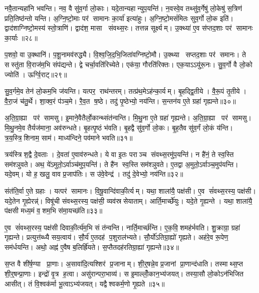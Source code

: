 नवै॒तान्यहा॑नि भवन्ति। नव॒ वै सु॑व॒र्गा लो॒काः। यदे॒तान्यहान्युप॒यन्ति॑। न॒वस्वे॒व तथ्सु॑व॒र्गेषु॑ लो॒केषु॑ स॒त्रिण॑ प्रति॒तिष्ठ॑न्तो यन्ति। अ॒ग्नि॒ष्टो॒माः पर॑ सामानः का॒र्या॑ इत्या॑हुः। अ॒ग्नि॒ष्टो॒मसं॑मितः सुव॒र्गो लो॒क इति॑। द्वाद॑शाग्निष्टो॒मस्य॑ स्तो॒त्राणि॑। द्वाद॑श॒ मासा संवथ्स॒रः। तत्तन्न सूर्क्ष्यम्। उ॒क्थ्या॑ ए॒व स॑प्तद॒शाः पर॑ सामानः का॒र्याः॥२८॥

प॒शवो॒ वा उ॒क्थानि॑। प॒शू॒नामव॑रुद्ध्यै। वि॒श्व॒जि॒द॒भि॒जिता॑वग्निष्टो॒मौ। उ॒क्थ्या सप्तद॒शाः पर॑ समानः। ते सस्तु॑ता वि॒राज॑म॒भि संप॑द्यन्ते। द्वे चर्चा॒वति॑रिच्येते। एक॑या॒ गौरति॑रिक्तः। एक॒याऽऽयु॑रू॒नः। सु॒व॒र्गो वै लो॒को ज्योति॑। ऊर्ग्वि॒राट्॥२९॥

सु॒व॒र्गमे॒व तेन॑ लो॒कम॒भि ज॑यन्ति। यत्पर॒ राथ॑न्तरम्। तत्प्र॑थ॒मेऽह॑न्का॒र्यम्। बृ॒हद्द्वि॒तीये। वै॒रू॒पं तृ॒तीये। वै॒रा॒जं च॑तु॒र्थे। शा॒क्व॒रं प॑ञ्च॒मे। रै॒व॒त ष॒ष्ठे। तदु॑ पृ॒ष्ठेभ्यो॒ नय॑न्ति। स॒न्तन॑य ए॒ते ग्रहा॑ गृह्यन्ते॥३०॥

अ॒ति॒ग्रा॒ह्या पर॑ सामसु। इ॒माने॒वैतैर्लो॒कान्थ्संत॑न्वन्ति। मि॒थु॒ना ए॒ते ग्रहा॑ गृह्यन्ते। अ॒ति॒ग्रा॒ह्या पर॑ सामसु। मि॒थु॒नमे॒व तैर्यज॑माना॒ अव॑रुन्धते। बृ॒हत्पृ॒ष्ठं भ॑वति। बृ॒हद्वै सु॑व॒र्गो लो॒कः। बृ॒ह॒तैव सु॑व॒र्गं लो॒कं य॑न्ति। त्र॒य॒स्त्रि॒शिनाम॒ साम॑। माध्य॑न्दिने॒ पव॑माने भवति॥३१॥

त्रय॑स्त्रिश॒द्वै दे॒वताः। दे॒वता॑ ए॒वाव॑रुन्धते। ये वा इ॒तः पराञ्च संवथ्स॒रमु॑प॒यन्ति॑। न है॑नं॒ ते स्व॒स्ति सम॑श्ञुवते। अथ॒ ये॑ऽमुतो॒ऽर्वाञ्च॑मुप॒यन्ति॑। ते है॑न स्व॒स्ति सम॑श्ञुवते। ए॒तद्वा अ॒मुतो॒ऽर्वाञ्च॒मुप॑यन्ति। यदे॒वम्। यो ह॒ खलु॒ वाव प्र॒जाप॑तिः। स उ॑वे॒वेन्द्र॑। तदु॑ दे॒वेभ्यो॒ नय॑न्ति॥३२॥\anuvakamend[का॒र्या॑ वि॒राड्गृ॑ह्यन्ते॒ पव॑माने भव॒तीन्द्र॒ एकं॑ च]

संत॑ति॒र्वा ए॒ते ग्रहाः। यत्पर॑ सामानः। वि॒षू॒वान्दि॑वाकी॒र्त्यम्। यथा॒ शाला॑यै॒ पक्ष॑सी। ए॒व सं॑वथ्स॒रस्य॒ पक्ष॑सी। यदे॒तेन गृ॒ह्येरन्न्॑। विषू॑ची संवथ्स॒रस्य॒ पक्ष॑सी॒ व्यव॑स्रसेयाताम्। आर्ति॒मार्च्छे॑युः। यदे॒ते गृ॒ह्यन्ते। यथा॒ शाला॑यै॒ प॑क्षसी मध्य॒मं व॒शम॒भि स॑मा॒यच्छ॑ति॥३३॥

ए॒व सं॑वथ्स॒रस्य॒ पक्ष॑सी दिवाकी॒र्त्य॑म॒भि सं त॑न्वन्ति। नार्ति॒मार्च्छ॑न्ति। ए॒क॒वि॒शमह॑र्भवति। शु॒क्राग्रा॒ ग्रहा॑ गृह्यन्ते। प्रत्युत्त॑ब्ध्यै सय॒त्वाय॑। सौ॒र्य॑ ए॒तदह॑ प॒शुराल॑भ्यते। सौ॒र्यो॑ऽतिग्रा॒ह्यो॑ गृह्यते। अह॑रे॒व रू॒पेण॒ सम॑र्धयन्ति। अथो॒ अह्न॑ ए॒वैष ब॒लिर्ह्रि॑यते। स॒प्तैतदह॑रतिग्रा॒ह्या॑ गृह्यन्ते॥३४॥

स॒प्त वै शी॑र्\mbox{}ष॒ण्या प्रा॒णाः। अ॒सावा॑दि॒त्यश्शिर॑ प्र॒जानाम्। शी॒र्॒षन्ने॒व प्र॒जानां प्रा॒णान्द॑धाति। तस्माथ्स॒प्त शी॒र्॒षन्प्रा॒णाः। इन्द्रो॑ वृ॒त्र ह॒त्वा। असु॑रान्परा॒भाव्य॑। स इ॒माल्लोँ॒कान॒भ्य॑जयत्। तस्या॒सौ लो॒कोऽन॑भिजित आसीत्। तं वि॒श्वक॑र्मा भू॒त्वाऽभ्य॑जयत्। यद्वैश्वकर्म॒णो गृ॒ह्यते॥३५॥

